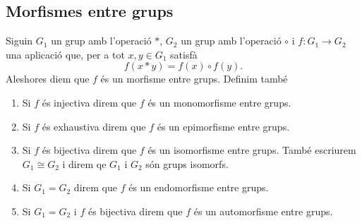 \documentclass[../Apunts.tex]{subfiles}
\begin{document}
	\subsection{Morfismes entre grups}
	\begin{definition}
		\label{def:morfisme entre grups}
		\label{def:monomorfisme entre grups}
		\label{def:epimorfisme entre grups}
		\label{def:isomorfisme entre grups}
		\label{def:endomorfisme entre grups}
		\label{def:automorfisme entre grups}
		Siguin \(G_{1}\) un grup amb l'operació \(\ast\), \(G_{2}\) un grup amb l'operació \(\circ\) i \(f\colon G_{1}\to G_{2}\) una aplicació que, per a tot \(x,y\in G_{1}\) satisfà
		\[f(x\ast y)=f(x)\circ f(y).\]
		Aleshores diem que \(f\) és un morfisme entre grups. Definim també
		\begin{enumerate}
			\item Si \(f\) és injectiva direm que \(f\) és un monomorfisme entre grups.
			\item Si \(f\) és exhaustiva direm que \(f\) és un epimorfisme entre grups.
			\item Si \(f\) és bijectiva direm que \(f\) és un isomorfisme entre grups. També escriurem \(G_{1}\cong G_{2}\) i direm qe \(G_{1}\) i \(G_{2}\) són grups isomorfs.
			\item Si \(G_{1}=G_{2}\) direm que \(f\) és un endomorfisme entre grups.
			\item Si \(G_{1}=G_{2}\) i \(f\) és bijectiva direm que \(f\) és un automorfisme entre grups.
		\end{enumerate}
	\end{definition}
\end{document}
